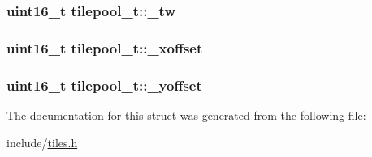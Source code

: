 \subsubsection[{\texorpdfstring{\+\_\+tw}{\_tw}}]{\setlength{\rightskip}{0pt plus 5cm}uint16\+\_\+t tilepool\+\_\+t\+::\+\_\+tw}\hypertarget{structtilepool__t_af3e69db6b6fc3ea8a1cfbe57a7f03331}{}\label{structtilepool__t_af3e69db6b6fc3ea8a1cfbe57a7f03331}
\subsubsection[{\texorpdfstring{\+\_\+xoffset}{\_xoffset}}]{\setlength{\rightskip}{0pt plus 5cm}uint16\+\_\+t tilepool\+\_\+t\+::\+\_\+xoffset}\hypertarget{structtilepool__t_aa13b342aa0f301e0d9b160e17a1e23d8}{}\label{structtilepool__t_aa13b342aa0f301e0d9b160e17a1e23d8}
\subsubsection[{\texorpdfstring{\+\_\+yoffset}{\_yoffset}}]{\setlength{\rightskip}{0pt plus 5cm}uint16\+\_\+t tilepool\+\_\+t\+::\+\_\+yoffset}\hypertarget{structtilepool__t_a3d49b78c34fd815960055061dc4e3086}{}\label{structtilepool__t_a3d49b78c34fd815960055061dc4e3086}


The documentation for this struct was generated from the following file\+:\begin{DoxyCompactItemize}
\item 
include/\hyperlink{tiles_8h}{tiles.\+h}\end{DoxyCompactItemize}
